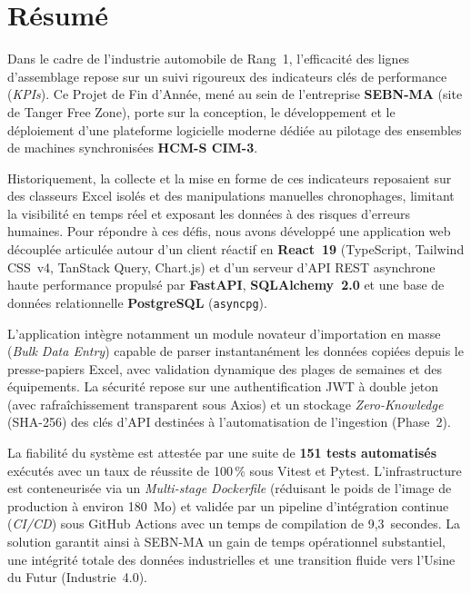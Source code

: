 \documentclass{report}
\begin{document}
\cleardoublepage
{}
\setcounter{page}{1}






\cleardoublepage
{}
\chapter*{Résumé}

Dans le cadre de l'industrie automobile de Rang~1, l'efficacité des lignes d'assemblage repose sur un suivi rigoureux des indicateurs clés de performance (\textit{KPIs}). Ce Projet de Fin d'Année, mené au sein de l'entreprise \textbf{SEBN-MA} (site de Tanger Free Zone), porte sur la conception, le développement et le déploiement d'une plateforme logicielle moderne dédiée au pilotage des ensembles de machines synchronisées \textbf{HCM-S CIM-3}.

Historiquement, la collecte et la mise en forme de ces indicateurs reposaient sur des classeurs Excel isolés et des manipulations manuelles chronophages, limitant la visibilité en temps réel et exposant les données à des risques d'erreurs humaines. Pour répondre à ces défis, nous avons développé une application web découplée articulée autour d'un client réactif en \textbf{React~19} (TypeScript, Tailwind CSS~v4, TanStack Query, Chart.js) et d'un serveur d'API REST asynchrone haute performance propulsé par \textbf{FastAPI}, \textbf{SQLAlchemy~2.0} et une base de données relationnelle \textbf{PostgreSQL} (\texttt{asyncpg}).

L'application intègre notamment un module novateur d'importation en masse (\textit{Bulk Data Entry}) capable de parser instantanément les données copiées depuis le presse-papiers Excel, avec validation dynamique des plages de semaines et des équipements. La sécurité repose sur une authentification JWT à double jeton (avec rafraîchissement transparent sous Axios) et un stockage \textit{Zero-Knowledge} (SHA-256) des clés d'API destinées à l'automatisation de l'ingestion (Phase~2). 

La fiabilité du système est attestée par une suite de \textbf{151 tests automatisés} exécutés avec un taux de réussite de 100\,\% sous Vitest et Pytest. L'infrastructure est conteneurisée via un \textit{Multi-stage Dockerfile} (réduisant le poids de l'image de production à environ 180~Mo) et validée par un pipeline d'intégration continue (\textit{CI/CD}) sous GitHub Actions avec un temps de compilation de 9,3~secondes. La solution garantit ainsi à SEBN-MA un gain de temps opérationnel substantiel, une intégrité totale des données industrielles et une transition fluide vers l'Usine du Futur (Industrie~4.0).
\end{document}
